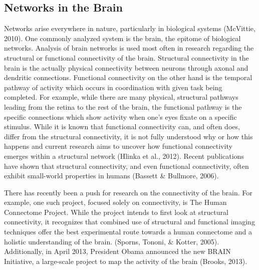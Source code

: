 \documentclass[11pt,letterpaper,doublespacing,titlepage]{article}
\begin{document}
\subsection{Networks in the Brain}
\par
Networks arise everywhere in nature, particularly in biological systems (McVittie, 2010). One commonly analyzed system is the brain, the epitome of biological networks. Analysis of brain networks is used most often in research regarding the structural or functional connectivity of the brain. Structural connectivity in the brain is the actually physical connectivity between neurons through axonal and dendritic connections. Functional connectivity on the other hand is the temporal pathway of activity which occurs in coordination with given task being completed. For example, while there are many physical, structural pathways leading from the retina to the rest of the brain, the functional pathway is the specific connections which show activity when one's eyes fixate on a specific stimulus. While it is known that functional connectivity can, and often does, differ from the structural connectivity, it is not fully understood why or how this happens and current research aims to uncover how functional connectivity emerges within a structural network (Hlinka et al., 2012). Recent publications have shown that structural connectivity, and even functional connectivity, often exhibit small-world properties in humans (Bassett \& Bullmore, 2006).


\par
There has recently been a push for research on the connectivity of the brain. For example, one such project, focused solely on connectivity, is The Human Connectome Project. While the project intends to first look at structural connectivity, it recognizes that combined use of structural and functional imaging techniques offer the best experimental route towards a human connectome and a holistic understanding of the brain. (Sporns, Tononi, \& Kotter, 2005). Additionally, in April 2013, President Obama announced the new BRAIN Initiative, a large-scale project to map the activity of the brain (Brooks, 2013).
\end{document}
